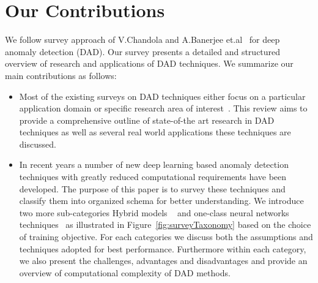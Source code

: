 \section{ Our Contributions}
We follow survey approach of V.Chandola and A.Banerjee et.al~\cite{chandola2007outlier} for deep  anomaly detection (DAD). Our survey presents a detailed and structured overview of research and applications of DAD techniques. We summarize our main contributions as follows:
\begin{itemize}
\item Most of the existing surveys on DAD techniques either focus on a particular
application domain or specific research area of interest~\cite{kiran2018overview,mohammadi2017deep,litjens2017survey,kwon2017survey,adewumi2017survey,ball2017comprehensive}.
This review aims to provide a comprehensive outline of state-of-the art research in DAD techniques as well as several real world applications these techniques are discussed.
\item In recent years a number of new deep learning based anomaly detection techniques  with greatly reduced computational requirements have been developed. The purpose of this paper is to survey these techniques and classify them into organized schema for better understanding. We introduce two more sub-categories Hybrid models ~\cite{erfani2016high} and one-class neural networks techniques~\cite{chalapathy2018anomaly} as illustrated in Figure~\ref{fig:surveyTaxonomy} based on the choice of training objective. For each categories we discuss both the assumptions and techniques adopted for best performance. Furthermore within each category, we also present the challenges, advantages and disadvantages and provide an overview of computational complexity of DAD methods.
\end{itemize}

